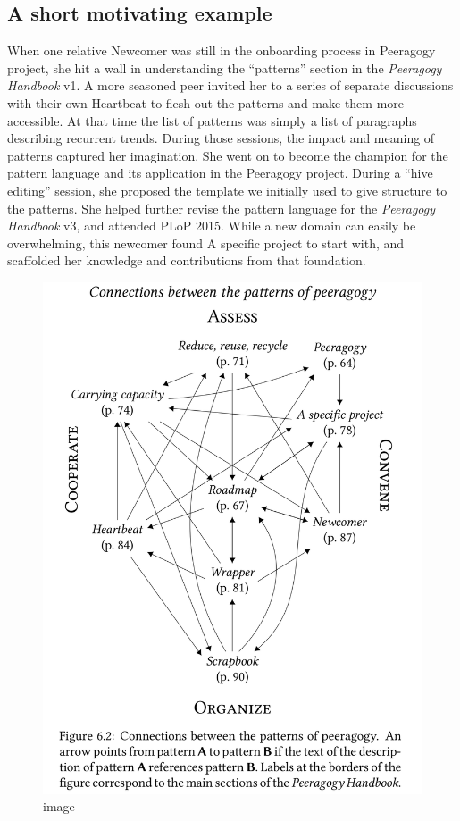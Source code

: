 \hypertarget{a-short-motivating-example}{%
\subsection{A short motivating
example}\label{a-short-motivating-example}}

When one relative {{Newcomer}} was still in the onboarding process in
Peeragogy project, she hit a wall in understanding the ``patterns''
section in the \emph{Peeragogy Handbook} v1. A more seasoned peer
invited her to a series of separate discussions with their own
{{Heartbeat}} to flesh out the patterns and make them more accessible.
At that time the list of patterns was simply a list of paragraphs
describing recurrent trends. During those sessions, the impact and
meaning of patterns captured her imagination. She went on to become the
champion for the pattern language and its application in the Peeragogy
project. During a ``hive editing'' session, she proposed the template we
initially used to give structure to the patterns. She helped further
revise the pattern language for the \emph{Peeragogy Handbook} v3, and
attended PLoP 2015. While a new domain can easily be overwhelming, this
newcomer found {{A specific project}} to start with, and scaffolded her
knowledge and contributions from that foundation.

\begin{figure}
\centering
\includegraphics{images/pattern-connections.png}
\caption{image}
\end{figure}

